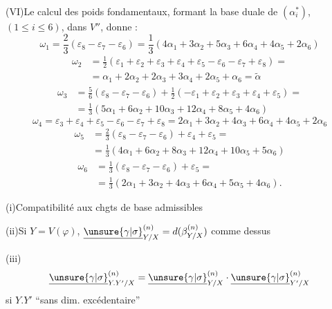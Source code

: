 (VI)\quad Le calcul des poids fondamentaux, formant la base duale de $(\alpha_i^*)$,
$(1\leq i\leq6)$, dans $V''$, donne :
\[
\omega_1=\frac23(\varepsilon_8-\varepsilon_7-\varepsilon_6)
=\frac13(4\alpha_1+3\alpha_2+5\alpha_3+6\alpha_4+4\alpha_5+2\alpha_6)
\]
\[
\begin{aligned}
\omega_2&=\frac12(\varepsilon_1+\varepsilon_2+\varepsilon_3+\varepsilon_4+
\varepsilon_5-\varepsilon_6-\varepsilon_7+\varepsilon_8)=\\
&=\alpha_1+2\alpha_2+2\alpha_3+3\alpha_4+2\alpha_5+\alpha_6=\tilde\alpha
\end{aligned}
\]
\[
\begin{aligned}
\omega_3&=\frac56(\varepsilon_8-\varepsilon_7-\varepsilon_6)
+\frac12(-\varepsilon_1+\varepsilon_2+\varepsilon_3+\varepsilon_4+\varepsilon_5)=\\
&=\frac13(5\alpha_1+6\alpha_2+10\alpha_3+12\alpha_4+8\alpha_5+4\alpha_6)
\end{aligned}
\]
\[
\omega_4=\varepsilon_3+\varepsilon_4+\varepsilon_5-\varepsilon_6-\varepsilon_7+\varepsilon_8
=2\alpha_1+3\alpha_2+4\alpha_3+6\alpha_4+4\alpha_5+2\alpha_6
\]
\[
\begin{aligned}
\omega_5&=\frac23(\varepsilon_8-\varepsilon_7-\varepsilon_6)+\varepsilon_4+\varepsilon_5=\\
&=\frac13(4\alpha_1+6\alpha_2+8\alpha_3+12\alpha_4+10\alpha_5+5\alpha_6)
\end{aligned}
\]
\[
\begin{aligned}
\omega_6&=\frac13(\varepsilon_8-\varepsilon_7-\varepsilon_6)+\varepsilon_5=\\
&=\frac13(2\alpha_1+3\alpha_2+4\alpha_3+6\alpha_4+5\alpha_5+4\alpha_6).
\end{aligned}
\]




(i)\quad Compatibilité aux chgts de base admissibles

(ii)\quad Si $Y=V(\varphi)$,
$\underline{\unsure{\gamma|\sigma}}_{Y/X}^{(n)}
=d(\beta_{Y/X}^{(n)})$ comme dessus

(iii)\quad
\[
\underline{\unsure{\gamma|\sigma}}_{Y.Y'/X}^{(n)}
=\underline{\unsure{\gamma|\sigma}}_{Y/X}^{(n)}
\cdot\underline{\unsure{\gamma|\sigma}}_{Y'/X}^{(n)}
\]
si $Y.Y'$ ``sans dim. excédentaire''


